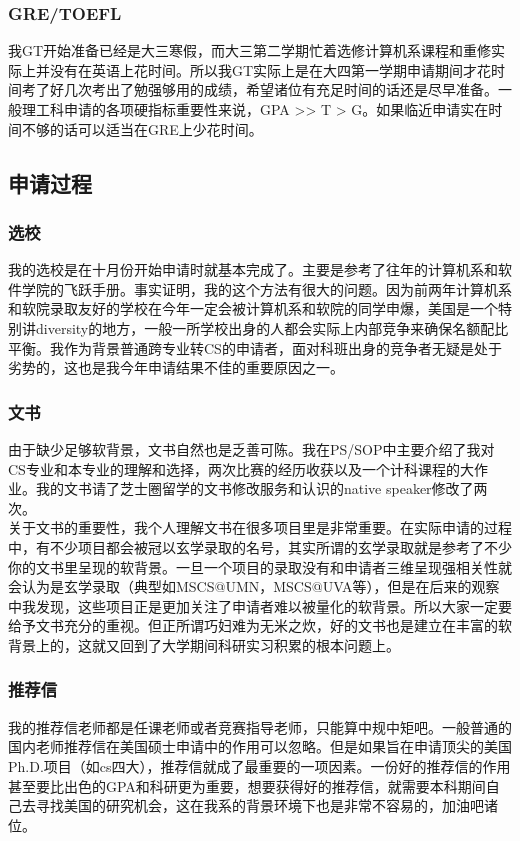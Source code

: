 \documentclass[a4paper,UTF8]{book}
\begin{document}
        \subsubsection*{GRE/TOEFL}
        我GT开始准备已经是大三寒假，而大三第二学期忙着选修计算机系课程和重修实际上并没有在英语上花时间。所以我GT实际上是在大四第一学期申请期间才花时间考了好几次考出了勉强够用的成绩，希望诸位有充足时间的话还是尽早准备。一般理工科申请的各项硬指标重要性来说，GPA >> T > G。如果临近申请实在时间不够的话可以适当在GRE上少花时间。

    \subsection*{申请过程}
        \subsubsection*{选校}
        我的选校是在十月份开始申请时就基本完成了。主要是参考了往年的计算机系和软件学院的飞跃手册。事实证明，我的这个方法有很大的问题。因为前两年计算机系和软院录取友好的学校在今年一定会被计算机系和软院的同学申爆，美国是一个特别讲diversity的地方，一般一所学校出身的人都会实际上内部竞争来确保名额配比平衡。我作为背景普通跨专业转CS的申请者，面对科班出身的竞争者无疑是处于劣势的，这也是我今年申请结果不佳的重要原因之一。

        \subsubsection*{文书}
        由于缺少足够软背景，文书自然也是乏善可陈。我在PS/SOP中主要介绍了我对CS专业和本专业的理解和选择，两次比赛的经历收获以及一个计科课程的大作业。我的文书请了芝士圈留学的文书修改服务和认识的native speaker修改了两次。\\
        关于文书的重要性，我个人理解文书在很多项目里是非常重要。在实际申请的过程中，有不少项目都会被冠以玄学录取的名号，其实所谓的玄学录取就是参考了不少你的文书里呈现的软背景。一旦一个项目的录取没有和申请者三维呈现强相关性就会认为是玄学录取（典型如MSCS@UMN，MSCS@UVA等），但是在后来的观察中我发现，这些项目正是更加关注了申请者难以被量化的软背景。所以大家一定要给予文书充分的重视。但正所谓巧妇难为无米之炊，好的文书也是建立在丰富的软背景上的，这就又回到了大学期间科研实习积累的根本问题上。

        \subsubsection*{推荐信}
        我的推荐信老师都是任课老师或者竞赛指导老师，只能算中规中矩吧。一般普通的国内老师推荐信在美国硕士申请中的作用可以忽略。但是如果旨在申请顶尖的美国Ph.D.项目（如cs四大），推荐信就成了最重要的一项因素。一份好的推荐信的作用甚至要比出色的GPA和科研更为重要，想要获得好的推荐信，就需要本科期间自己去寻找美国的研究机会，这在我系的背景环境下也是非常不容易的，加油吧诸位。
\end{document}
